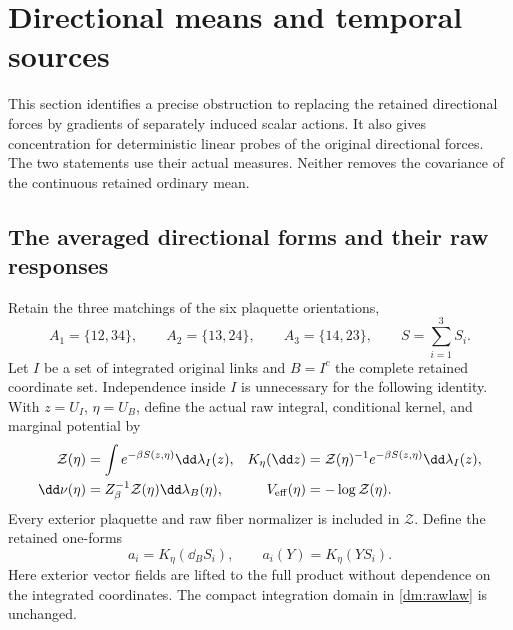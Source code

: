\section{Directional means and temporal sources}
\label{dm:section}

This section identifies a precise obstruction to replacing the retained directional forces by gradients of separately induced scalar actions. It also gives concentration for deterministic linear probes of the original directional forces. The two statements use their actual measures. Neither removes the covariance of the continuous retained ordinary mean.

\subsection{The averaged directional forms and their raw responses}

Retain the three matchings of the six plaquette orientations,
\[
 A_1=\{12,34\},\qquad A_2=\{13,24\},\qquad
 A_3=\{14,23\},\qquad S=\sum_{i=1}^3S_i.
\]
Let \(I\) be a set of integrated original links and \(B=I^c\) the complete retained coordinate set. Independence inside \(I\) is unnecessary for the following identity. With \(z=U_I\), \(\eta=U_B\), define the actual raw integral, conditional kernel, and marginal potential by
\begin{align}
 \mathcal Z(\eta)&=\int e^{-\beta S(z,\eta)}\dd\lambda_I(z),
 &K_\eta(\dd z)&=\mathcal Z(\eta)^{-1}e^{-\beta S(z,\eta)}\dd\lambda_I(z),\notag\\
 \dd\nu(\eta)&=Z_\beta^{-1}\mathcal Z(\eta)\dd\lambda_B(\eta),
 &V_{\rm eff}(\eta)&=-\log\mathcal Z(\eta).
 \label{dm:rawlaw}
\end{align}
Every exterior plaquette and raw fiber normalizer is included in \(\mathcal Z\). Define the retained one-forms
\begin{equation}
 a_i=K_\eta(\dd_B S_i),\qquad a_i(Y)=K_\eta(YS_i).
 \label{dm:forms}
\end{equation}
Here exterior vector fields are lifted to the full product without dependence on the integrated coordinates. The compact integration domain in \eqref{dm:rawlaw} is unchanged.

